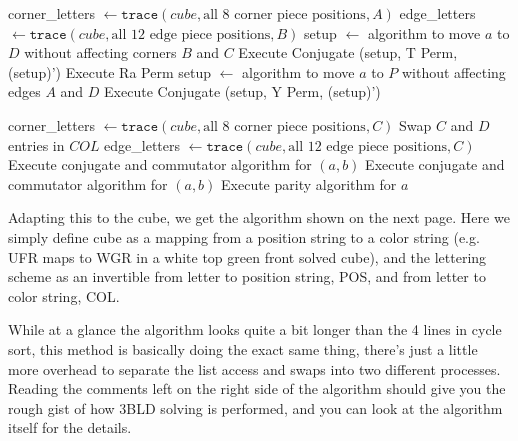 \documentclass{article}
\begin{document}
\begin{algorithm}[!h]
\begin{algorithmic}
        \State corner\_letters $\gets\texttt{trace}(cube, \text{all 8 corner piece positions}, A)$ 
        \State edge\_letters $\gets\texttt{trace}(cube, \text{all 12 edge piece positions}, B)$
            \State setup $\gets$ algorithm to move $a$ to $D$ without affecting corners $B$ and $C$
            \State Execute Conjugate (setup, T Perm, (setup)')
        \EndFor
         
            \State Execute Ra Perm
        \EndIf
            \State setup $\gets$ algorithm to move $a$ to $P$ without affecting edges $A$ and $D$
            \State Execute Conjugate (setup, Y Perm, (setup)')
        \EndFor
    \EndFunction

    \vspace{1em}
    
        \State corner\_letters $\gets\texttt{trace}(cube, \text{all 8 corner piece positions}, C)$ 
         
            \State Swap $C$ and $D$ entries in $COL$
        \EndIf
        \State edge\_letters $\gets\texttt{trace}(cube, \text{all 12 edge piece positions}, C)$
         
            \State Execute conjugate and commutator algorithm for $(a,b)$
        \EndFor
         
            \State Execute conjugate and commutator algorithm for $(a,b)$
        \EndFor
         
            \State Execute parity algorithm for $a$
        \EndIf
    \EndFunction
    \end{algorithmic}
\end{algorithm}


Adapting this to the cube, we get the algorithm shown on the next page. Here we simply define cube as a mapping from a position string to a color string (e.g. UFR maps to WGR in a white top green front solved cube), and the lettering scheme as an invertible from letter to position string, POS, and from letter to color string, COL.

While at a glance the algorithm looks quite a bit longer than the 4 lines in cycle sort, this method is basically doing the exact same thing, there's just a little more overhead to separate the list access and swaps into two different processes. Reading the comments left on the right side of the algorithm should give you the rough gist of how 3BLD solving is performed, and you can look at the algorithm itself for the details.
\end{document}
